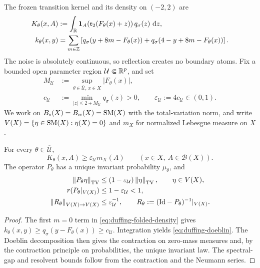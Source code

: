 The frozen transition kernel and its density on $(-2,2)$ are
\begin{align}
  K_\theta(x,A)
    &:=\int_{\mathbb{R}}\mathbf1_A\!\left(\mathfrak r_2(F_\theta(x)+z)\right)
      q_\sigma(z)\,\,\mathrm{d} z,
  \label{eq:duffing-kernel}\\
  k_\theta(x,y)
    &=\sum_{m\in\mathbb Z}\left[
      q_\sigma(y+8m-F_\theta(x))
      +q_\sigma(4-y+8m-F_\theta(x))\right].
  \label{eq:duffing-folded-density}
\end{align}
The noise is absolutely continuous, so reflection creates no boundary atoms.
Fix a bounded open parameter region $\mathcal U\Subset\mathbb{R}^p$, and set
\begin{align}
  M_{\mathcal U}
    &:=\sup_{\theta\in\overline{\mathcal U},\,x\in X}|F_\theta(x)|,
  \label{eq:duffing-MU}\\
  c_{\mathcal U}
    &:=\min_{|z|\le2+M_{\mathcal U}}q_\sigma(z)>0,
  \qquad \varepsilon_{\mathcal U}:=4c_{\mathcal U}\in(0,1).
  \label{eq:duffing-doeblin-constant}
\end{align}
We work on $B_s(X)=B_w(X)=\mathrm{SM}(X)$ with the total-variation norm,
and write $V(X)=\{\eta\in\mathrm{SM}(X):\eta(X)=0\}$ and $m_X$ for normalized
Lebesgue measure on $X$.

\begin{proposition}
\label{prop:duffing-doeblin}
For every $\theta\in\overline{\mathcal U}$,
\begin{equation}
  K_\theta(x,A)\ge\varepsilon_{\mathcal U}m_X(A)
  \qquad(x\in X,\ A\in\mathcal B(X)).
  \label{eq:duffing-doeblin}
\end{equation}
The operator $P_\theta$ has a unique invariant probability $\mu_\theta$,
and
\begin{align}
  \left\lVert P_\theta\eta\right\rVert_{\rm TV}
    &\le(1-\varepsilon_{\mathcal U})\left\lVert \eta\right\rVert_{\rm TV},
    \qquad \eta\in V(X),
  \label{eq:duffing-TV-contraction}\\
  r(P_\theta|_{V(X)})&\le1-\varepsilon_{\mathcal U}<1,
  \label{eq:duffing-spectral-gap}\\
  \left\lVert R_\theta\right\rVert_{V(X)\to V(X)}&\le\varepsilon_{\mathcal U}^{-1},
    \qquad R_\theta:=(\mathrm{Id}-P_\theta)^{-1}|_{V(X)}.
  \label{eq:duffing-resolvent-bound}
\end{align}
\end{proposition}

\begin{proof}
The first $m=0$ term in \eqref{eq:duffing-folded-density} gives
$k_\theta(x,y)\ge q_\sigma(y-F_\theta(x))\ge c_{\mathcal U}$.
Integration yields \eqref{eq:duffing-doeblin}. The Doeblin decomposition
then gives the contraction on zero-mass measures and, by the contraction
principle on probabilities, the unique invariant law. The spectral-gap
and resolvent bounds follow from the contraction and the Neumann series.
\end{proof}


